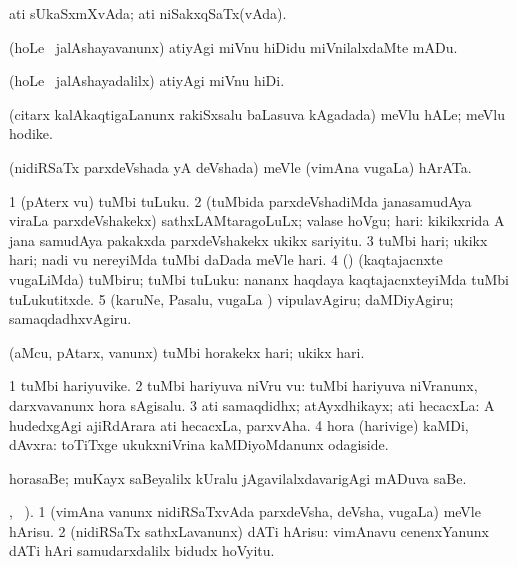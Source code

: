 \bentry
{}
\gl{\gu}
\bmng
ati sUkaSxmXvAda; ati niSakxqSaTx(vAda). 
\emng
\eentry

\bentry
{}
\gl{\sakirx}
\bmng
(hoLe \mo\ jalAshayavanunx) atiyAgi miVnu hiDidu miVnilalxdaMte mADu. 
\emng

\noindent
\gl{\akirx}
\bmng
(hoLe \mo\ jalAshayadalilx) atiyAgi miVnu hiDi. 
\emng
\eentry

\bentry
{}
\gl{\nA}
\bmng
(citarx kalAkaqtigaLanunx rakiSxsalu baLasuva kAgadada) meVlu hALe; meVlu hodike. 
\emng
\eentry

\bentry
{}
\gl{\nA}
\bmng
(nidiRSaTx parxdeVshada yA deVshada) meVle (vimAna \mo vugaLa) hArATa. 
\emng
\eentry

\bentry
{}
\gl{\akirx}
\bmng
\bnum
\num{1} (pAterx \mo vu) tuMbi tuLuku. 
\num{2} (tuMbida parxdeVshadiMda janasamudAya viraLa parxdeVshakekx) sathxLAMtaragoLuLx; valase hoVgu; hari:  kikikxrida A jana samudAya pakakxda parxdeVshakekx ukikx sariyitu. 
\num{3} tuMbi hari; ukikx hari; nadi \mo vu nereyiMda tuMbi daDada meVle hari. 
\num{4} (\rUpa) (kaqtajacnxte \mo vugaLiMda) tuMbiru; tuMbi tuLuku:  nananx haqdaya kaqtajacnxteyiMda tuMbi tuLukutitxde. 
\num{5} (karuNe, Pasalu, \mo vugaLa \vi) vipulavAgiru; daMDiyAgiru; samaqdadhxvAgiru. 
\enum
\emng

\noindent
\gl{\sakirx}
\bmng
(aMcu, pAtarx, \mo vanunx) tuMbi horakekx hari; ukikx hari. 
\emng
\eentry

\bentry
{}
\gl{\nA}
\bmng
\bnum
\num{1} tuMbi hariyuvike. 
\num{2} tuMbi hariyuva niVru \mo vu:  tuMbi hariyuva niVranunx, darxvavanunx hora sAgisalu. 
\num{3} ati samaqdidhx; atAyxdhikayx; ati hecacxLa:  A hudedxgAgi ajiRdArara ati hecacxLa, parxvAha. 
\num{4} hora (harivige) kaMDi, dAvxra:  toTiTxge ukukxniVrina kaMDiyoMdanunx odagiside. 
\enum
\emng

\noindent
\gl{\pagu}
\bmng
{} horasaBe; muKayx saBeyalilx kUralu jAgavilalxdavarigAgi mADuva saBe. 
\emng
\eentry

\bentry
{}
\gl{\sakirx}
, \BUkaq\ ).\bmng
\bnum
\num{1} (vimAna \mo vanunx nidiRSaTxvAda parxdeVsha, deVsha, \mo vugaLa) meVle hArisu. 
\num{2} (nidiRSaTx sathxLavanunx) dATi hArisu:  vimAnavu cenenxYanunx dATi hAri samudarxdalilx bidudx hoVyitu. 
\enum
\emng
\eentry

